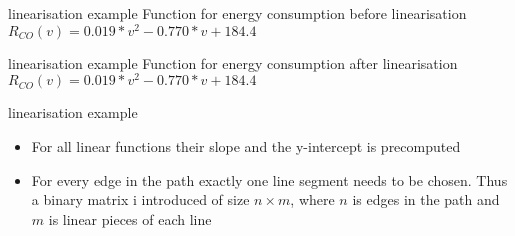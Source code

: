 \begin{frame}{linearisation example}
Function for energy consumption before linearisation $R_{CO}(v)=0.019*v^2 - 0.770*v + 184.4$
\begin{figure}[!htb]
\label{fig:graph}
% 

\label{fig:graph}
\end{figure}
\end{frame}

\begin{frame}{linearisation example}
Function for energy consumption after linearisation $R_{CO}(v)=0.019*v^2 - 0.770*v + 184.4$
\begin{figure}[!htb]
\label{fig:graph}
% 

\label{fig:graph}
\end{figure}

\end{frame}
\begin{frame}{linearisation example}
\begin{itemize}
\item For all linear functions their slope and the y-intercept is precomputed 
\item For every edge in the path exactly one line segment needs to be chosen. Thus a binary matrix i introduced of size $n \times m$, where $n$ is edges in the path and $m$ is linear pieces of each line 
\end{itemize}
\end{frame}



